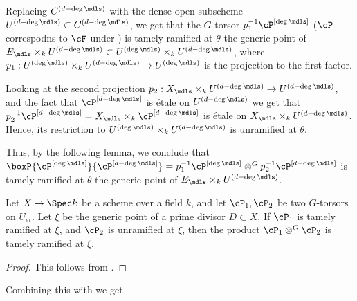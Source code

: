 Replacing $C^{(d - \deg \mdls)}$ with the dense open subscheme $U^{(d - \deg \mdls)} \subset C^{(d - \deg \mdls)}$,
we get that the $G$-torsor $p_1^{-1} \cP^{[\deg \mdls]}$ ($\cP$ correspodns to $\cF$ under )
is tamely ramified at $\theta$ the generic point of
$E_{\mdls} \times_k U^{(d-\deg \mdls)} \subset U^{(\deg \mdls)} \times_k U^{(d - \deg \mdls)}$,
where $p_1: U^{(\deg \mdls)} \times_k U^{(d - \deg \mdls)} \to U^{(\deg \mdls)}$ is the projection to the first factor.

Looking at the second projection $p_2:X_{\mdls} \times_k U^{(d - \deg \mdls)} \to U^{(d - \deg \mdls)}$, and the fact that 
$\cP^{[d - \deg \mdls]}$ is \'etale on $U^{(d - \deg \mdls)}$ we get that 
$p_2^{-1} \cP^{[d - \deg \mdls]}= X_{\mdls} \times_k \cP^{[d - \deg \mdls]}$ is \'etale on $X_{\mdls} \times_k U^{(d - \deg \mdls)}$.
Hence, its restriction to $U^{(\deg \mdls)} \times_k U^{(d - \deg \mdls)}$ is unramified at $\theta$.

Thus, by the following lemma, we conclude that $\boxP{\cP^{[\deg \mdls]}}{\cP^{[d - \deg \mdls]}} = p_1^{-1} \cP^{[\deg \mdls]} \otimes^G p_2^{-1} \cP^{[d - \deg \mdls]}$
     is tamely ramified at $\theta$ the generic point of $E_{\mdls} \times_k U^{(d-\deg \mdls)}$.

\begin{lemma}
     Let $X \to \Spec k$ be a scheme over a field $k$, and let $\cP_1, \cP_2$ be two $G$-torsors on $U_{et}$.
     Let $\xi$ be the generic point of a prime divisor $D \subset X$.
     If $\cP_1$ is tamely ramified at $\xi$, and $\cP_2$ is unramified at $\xi$,
     then the product $\cP_1 \otimes^G \cP_2$ is tamely ramified at $\xi$.
\end{lemma}
\begin{proof}
     This follows from .
\end{proof}

Combining this with  we get

